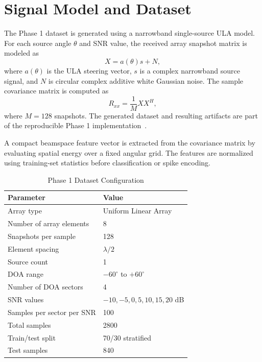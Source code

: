 \documentclass[11pt]{article}
\begin{document}
\section{Signal Model and Dataset}

The Phase 1 dataset is generated using a narrowband single-source ULA model. For each source angle $\theta$ and SNR value, the received array snapshot matrix is modeled as
\begin{equation}
    X = a(\theta)s + N,
\end{equation}
where $a(\theta)$ is the ULA steering vector, $s$ is a complex narrowband source signal, and $N$ is circular complex additive white Gaussian noise. The sample covariance matrix is computed as
\begin{equation}
    R_{xx} = \frac{1}{M}XX^{H},
\end{equation}
where $M=128$ snapshots. The generated dataset and resulting artifacts are part of the reproducible Phase 1 implementation~\cite{molhem2026embeddedai}.

A compact beamspace feature vector is extracted from the covariance matrix by evaluating spatial energy over a fixed angular grid. The features are normalized using training-set statistics before classification or spike encoding.

\begin{table}[H]
\centering
\caption{Phase 1 Dataset Configuration}
\begin{tabular}{ll}
\toprule
Parameter & Value \\
\midrule
Array type & Uniform Linear Array \\
Number of array elements & 8 \\
Snapshots per sample & 128 \\
Element spacing & $\lambda/2$ \\
Source count & 1 \\
DOA range & $-60^{\circ}$ to $+60^{\circ}$ \\
Number of DOA sectors & 4 \\
SNR values & $-10,-5,0,5,10,15,20$ dB \\
Samples per sector per SNR & 100 \\
Total samples & 2800 \\
Train/test split & 70/30 stratified \\
Test samples & 840 \\
\bottomrule
\end{tabular}
\end{table}
\end{document}
